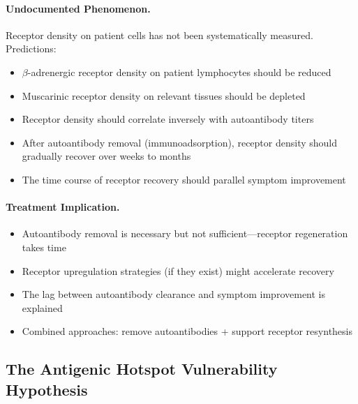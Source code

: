 \paragraph{Undocumented Phenomenon.} Receptor density on patient cells has not been systematically measured. Predictions:
\begin{itemize}
    \item $\beta$-adrenergic receptor density on patient lymphocytes should be reduced
    \item Muscarinic receptor density on relevant tissues should be depleted
    \item Receptor density should correlate inversely with autoantibody titers
    \item After autoantibody removal (immunoadsorption), receptor density should gradually recover over weeks to months
    \item The time course of receptor recovery should parallel symptom improvement
\end{itemize}

\paragraph{Treatment Implication.}
\begin{itemize}
    \item Autoantibody removal is necessary but not sufficient---receptor regeneration takes time
    \item Receptor upregulation strategies (if they exist) might accelerate recovery
    \item The lag between autoantibody clearance and symptom improvement is explained
    \item Combined approaches: remove autoantibodies + support receptor resynthesis
\end{itemize}

\subsection{The Antigenic Hotspot Vulnerability Hypothesis}

